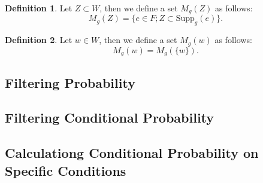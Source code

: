 \documentclass[11pt, a4paper]{article}
\theoremstyle{definition}
\newtheorem{definition}{Definition}[section]
\begin{document}
\begin{definition}
Let $ Z \subset W $, then we define a set $ M_{g}(Z) $ as follows:
\begin{equation}
M_{g}(Z) = \{e \in F ; Z \subset \mathrm{Supp}_{g}(e)\}.
\end{equation}
\end{definition}

\begin{definition}
Let $ w \in W $, then we define a set $ M_{g}(w) $ as follows:
\begin{equation}
M_{g}(w) = M_{g}(\{w\}).
\end{equation}
\end{definition}

\subsection{Filtering Probability}

\subsection{Filtering Conditional Probability}

\subsection{Calculationg Conditional Probability on Specific Conditions}

\end{document}
